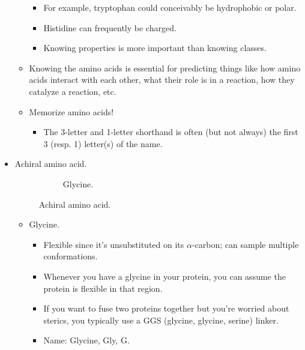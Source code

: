 \documentclass[../notes.tex]{subfiles}
\begin{document}
\begin{itemize}
\begin{itemize}
        \begin{itemize}
            \item For example, tryptophan could conceivably be hydrophobic or polar.
            \item Histidine can frequently be charged.
            \item Knowing properties is more important than knowing classes.
        \end{itemize}
        \item Knowing the amino acids is essential for predicting things like how amino acids interact with each other, what their role is in a reaction, how they catalyze a reaction, etc.
        \item Memorize amino acids!
        \begin{itemize}
            \item The 3-letter and 1-letter shorthand is often (but not always) the first 3 (resp. 1) letter(s) of the name.
        \end{itemize}
    \end{itemize}
    \item Achiral amino acid.
    \begin{figure}[h!]
        \centering
        \footnotesize
        \begin{subfigure}[b]{0.19\linewidth}
            \centering
            \caption{Glycine.}
            \label{fig:AAachiralG}
        \end{subfigure}
        \caption{Achiral amino acid.}
        \label{fig:AAachiral}
    \end{figure}
    \begin{itemize}
        \item Glycine.
        \begin{itemize}
            \item Flexible since it's unsubstituted on its $\alpha$-carbon; can sample multiple conformations.
            \item Whenever you have a glycine in your protein, you can assume the protein is flexible in that region.
            \item If you want to fuse two proteins together but you're worried about sterics, you typically use a GGS (glycine, glycine, serine) linker.
            \item Name: Glycine, Gly, G.
        \end{itemize}
    \end{itemize}

\end{itemize}
\end{document}

